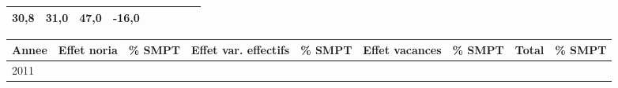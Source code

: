 \begin{longtable}[]{@{}lllllllll@{}}
\begin{minipage}[t]{0.10\columnwidth}
30,8\strut
\end{minipage} & \begin{minipage}[t]{0.07\columnwidth}\raggedright
31,0\strut
\end{minipage} & \begin{minipage}[t]{0.07\columnwidth}\raggedright
47,0\strut
\end{minipage} & \begin{minipage}[t]{0.11\columnwidth}\raggedright
-16,0\strut
\end{minipage} & \begin{minipage}[t]{0.14\columnwidth}\raggedright
\strut
\end{minipage}\tabularnewline
\bottomrule
\end{longtable}

\begin{longtable}[]{@{}lllllllll@{}}
\toprule
\begin{minipage}[b]{0.05\columnwidth}\raggedright
Annee\strut
\end{minipage} & \begin{minipage}[b]{0.10\columnwidth}\raggedright
Effet noria\strut
\end{minipage} & \begin{minipage}[b]{0.06\columnwidth}\raggedright
\% SMPT\strut
\end{minipage} & \begin{minipage}[b]{0.16\columnwidth}\raggedright
Effet var. effectifs\strut
\end{minipage} & \begin{minipage}[b]{0.06\columnwidth}\raggedright
\% SMPT\strut
\end{minipage} & \begin{minipage}[b]{0.12\columnwidth}\raggedright
Effet vacances\strut
\end{minipage} & \begin{minipage}[b]{0.06\columnwidth}\raggedright
\% SMPT\strut
\end{minipage} & \begin{minipage}[b]{0.10\columnwidth}\raggedright
Total\strut
\end{minipage} & \begin{minipage}[b]{0.06\columnwidth}\raggedright
\% SMPT\strut
\end{minipage}\tabularnewline
\midrule
\endhead
\begin{minipage}[t]{0.05\columnwidth}\raggedright
2011\strut
\end{minipage} & \begin{minipage}[t]{0.10\columnwidth}\raggedright

\end{minipage}
\end{longtable}
